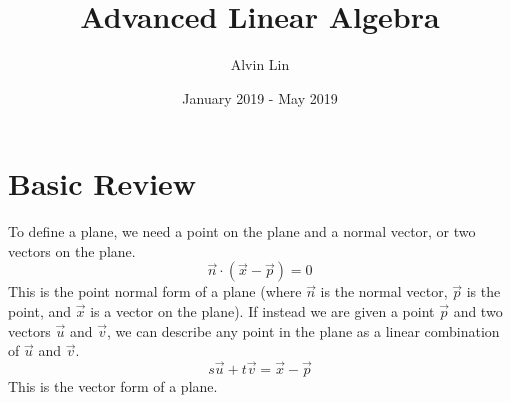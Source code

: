 \documentclass{math}
\title{Advanced Linear Algebra}
\author{Alvin Lin}
\date{January 2019 - May 2019}
\begin{document}
\maketitle

\section*{Basic Review}
To define a plane, we need a point on the plane and a normal vector, or two
vectors on the plane.
\[ \vec{n}\cdot(\vec{x}-\vec{p}) = 0 \]
This is the point normal form of a plane (where \( \vec{n} \) is the normal
vector, \( \vec{p} \) is the point, and \( \vec{x} \) is a vector on the plane).
If instead we are given a point \( \vec{p} \) and two vectors \( \vec{u} \) and
\( \vec{v} \), we can describe any point in the plane as a linear combination of
\( \vec{u} \) and \( \vec{v} \).
\[ s\vec{u}+t\vec{v} = \vec{x}-\vec{p} \]
This is the vector form of a plane.
\end{document}
